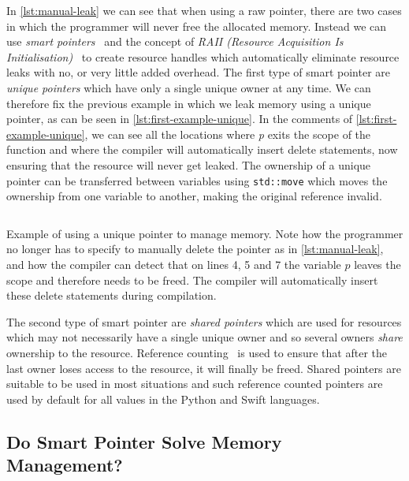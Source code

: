 \documentclass{proposal}
\begin{document}

    In \autoref{lst:manual-leak} we can see that when using a raw pointer, there are two cases in which the programmer will never free the allocated memory.
    Instead we can use \emph{smart pointers}~\cite{Dimov2003} and the concept of \emph{RAII (Resource Acquisition Is Initialisation)}~\cite{Stroustrup2000} to create resource handles which automatically eliminate resource leaks with no, or very little added overhead.
    The first type of smart pointer are \emph{unique pointers} which have only a single unique owner at any time.
    We can therefore fix the previous example in which we leak memory using a unique pointer, as can be seen in \autoref{lst:first-example-unique}.
    In the comments of \autoref{lst:first-example-unique}, we can see all the locations where \emph{p} exits the scope of the function and where the compiler will automatically insert delete statements, now ensuring that the resource will never get leaked.
    The ownership of a unique pointer can be transferred between variables using \texttt{std::move} which moves the ownership from one variable to another, making the original reference invalid.

    \begin{listing}
        \inputminted{c++}{code/first-example-unique.cpp}
        \caption{Example of using a unique pointer to manage memory. Note how the programmer no longer has to specify to manually delete the pointer as in \autoref{lst:manual-leak}, and how the compiler can detect that on lines 4, 5 and 7 the variable $p$ leaves the scope and therefore needs to be freed. The compiler will automatically insert these delete statements during compilation.}
        \label{lst:first-example-unique}
    \end{listing}

    The second type of smart pointer are \emph{shared pointers} which are used for resources which may not necessarily have a single unique owner and so several owners \emph{share} ownership to the resource.
    Reference counting~\cite{Collins1960} is used to ensure that after the last owner loses access to the resource, it will finally be freed.
    Shared pointers are suitable to be used in most situations and such reference counted pointers are used by default for all values in the Python and Swift languages.

    \subsection{Do Smart Pointer Solve Memory Management?}\label{subsec:do-smart-pointer-solve-memory-management?}
\end{document}
